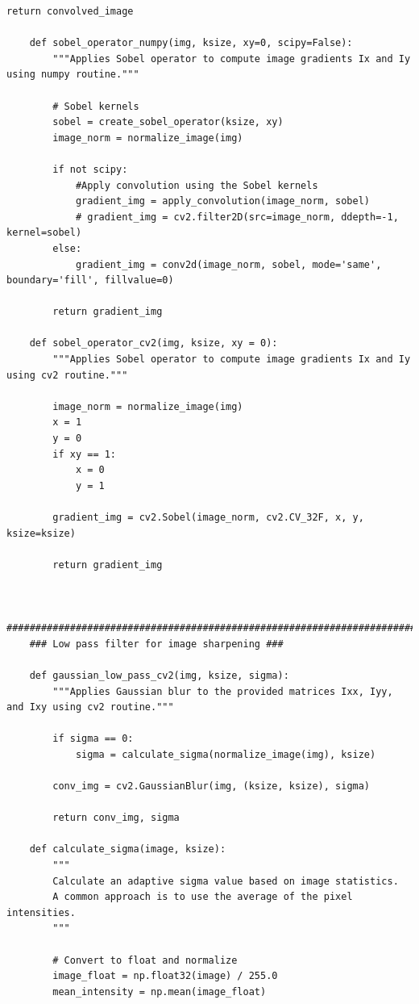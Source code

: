 \documentclass[11pt, conference, letterpaper]{IEEEtran}
\begin{document}
\begin{lstlisting}[style=python, caption={\texttt{image\_utils.py}}, label={lst:iutils}]
        return convolved_image
    
    def sobel_operator_numpy(img, ksize, xy=0, scipy=False):
        """Applies Sobel operator to compute image gradients Ix and Iy using numpy routine."""
        
        # Sobel kernels
        sobel = create_sobel_operator(ksize, xy)
        image_norm = normalize_image(img)
    
        if not scipy:
            #Apply convolution using the Sobel kernels
            gradient_img = apply_convolution(image_norm, sobel)
            # gradient_img = cv2.filter2D(src=image_norm, ddepth=-1, kernel=sobel)
        else:
            gradient_img = conv2d(image_norm, sobel, mode='same', boundary='fill', fillvalue=0)
            
        return gradient_img
    
    def sobel_operator_cv2(img, ksize, xy = 0):
        """Applies Sobel operator to compute image gradients Ix and Iy using cv2 routine."""
        
        image_norm = normalize_image(img)
        x = 1
        y = 0
        if xy == 1:
            x = 0
            y = 1
        
        gradient_img = cv2.Sobel(image_norm, cv2.CV_32F, x, y, ksize=ksize)
        
        return gradient_img
    
    
    ##########################################################################################
    ### Low pass filter for image sharpening ###
    
    def gaussian_low_pass_cv2(img, ksize, sigma):
        """Applies Gaussian blur to the provided matrices Ixx, Iyy, and Ixy using cv2 routine."""
        
        if sigma == 0:
            sigma = calculate_sigma(normalize_image(img), ksize)
        
        conv_img = cv2.GaussianBlur(img, (ksize, ksize), sigma)
    
        return conv_img, sigma
    
    def calculate_sigma(image, ksize):
        """
        Calculate an adaptive sigma value based on image statistics.
        A common approach is to use the average of the pixel intensities.
        """
        
        # Convert to float and normalize
        image_float = np.float32(image) / 255.0
        mean_intensity = np.mean(image_float)
    

\end{lstlisting}
\end{document}
